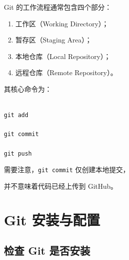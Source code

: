 Git 的工作流程通常包含四个部分：



\begin{enumerate}

    \item 工作区（Working Directory）；

    \item 暂存区（Staging Area）；

    \item 本地仓库（Local Repository）；

    \item 远程仓库（Remote Repository）。

\end{enumerate}



其核心命令为：



\begin{lstlisting}

git add

git commit

git push

\end{lstlisting}









需要注意，\texttt{git commit} 仅创建本地提交，

并不意味着代码已经上传到 GitHub。










\section{Git 安装与配置}



\subsection{检查 Git 是否安装}



